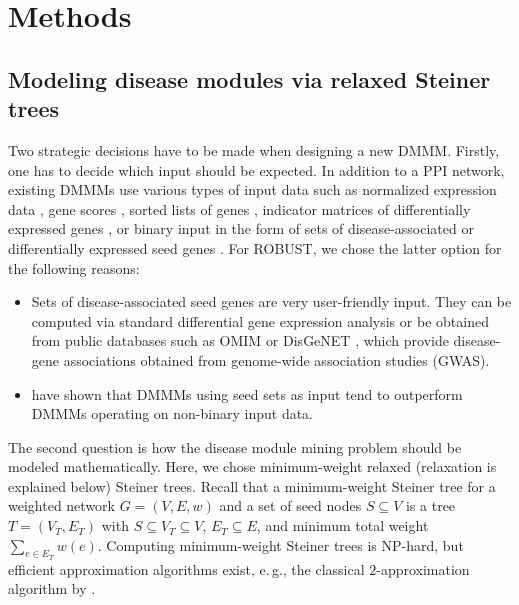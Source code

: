 \documentclass{bioinfo}
\makeatletter
\newcommand{\eg}{e.\,g.\@\xspace}
\makeatother
\begin{document}
%


\section{Methods}

\subsection{Modeling disease modules via relaxed Steiner trees}

Two strategic decisions have to be made when designing a new DMMM. Firstly, one has to decide which input should be expected. In addition to a PPI network, existing DMMMs use various types of input data such as normalized expression data \citep{gnax_nacu2007,cosine_ma2011,grandforest_larsen2020}, gene scores \citep{Reyna2018-ti,netcore_barel2020}, sorted lists of genes \citep{giga_breitling2004}, indicator matrices of differentially expressed genes \citep{keypathwayminerweb_list2016}, or binary input in the form of sets of disease-associated or differentially expressed seed genes \citep{diamond_ghiassian2015,clustex2_ding2018,covex_sadegh2020,domino_levi2021}. For ROBUST, we chose the latter option for the following reasons:
\begin{itemize}
\item Sets of disease-associated seed genes are very user-friendly input. They can be computed via standard differential gene expression analysis or be obtained from public databases such as OMIM \citep{Amberger2019-mp} or DisGeNET \citep{disgenet_pinero2020}, which provide disease-gene associations obtained from genome-wide association studies (GWAS). 
\item \cite{domino_levi2021} have shown that DMMMs using seed sets as input tend to outperform DMMMs operating on non-binary input data.
\end{itemize}

The second question is how the disease module mining problem should be modeled mathematically. Here, we chose minimum-weight relaxed (relaxation is explained below) Steiner trees. Recall that a minimum-weight Steiner tree for a weighted network $G=(V,E,w)$ and a set of seed nodes $S\subseteq V$ is a tree $T=(V_T,E_T)$ with $S\subseteq V_T\subseteq V$, $E_T\subseteq E$, and minimum total weight $\sum_{e\in E_T}w(e)$. Computing minimum-weight Steiner trees is NP-hard, but efficient approximation algorithms exist, \eg, the classical $2$-approximation algorithm by \cite{kou:1981aa}.
\end{document}
